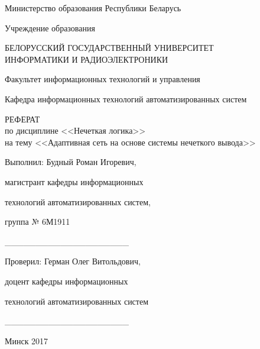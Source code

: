 \begin{titlepage}
\thispagestyle{empty}
\setlength{\parindent}{0cm} %

{\centering{}
  Министерство образования Республики Беларусь

  \smallskip
  Учреждение образования

  БЕЛОРУССКИЙ ГОСУДАРСТВЕННЫЙ УНИВЕРСИТЕТ \\
  ИНФОРМАТИКИ И РАДИОЭЛЕКТРОНИКИ

  \smallskip
  Факультет информационных технологий и управления

  \smallskip
  Кафедра информационных технологий автоматизированных систем\par
}

\vspace{50mm}

{\centering{}
  РЕФЕРАТ \\
  по дисциплине <<Нечеткая логика>> \\
  на тему <<Адаптивная сеть на основе системы нечеткого вывода>>\par
}

\vspace{30mm}

\begin{minipage}{.1\linewidth}
\end{minipage}
\hfill
\begin{minipage}{.7\linewidth}
  Выполнил: Будный Роман Игоревич,

  \hspace{2.4cm} магистрант кафедры информационных

  \hspace{2.4cm} технологий автоматизированных систем,

  \hspace{2.4cm} группа № 6М1911

  \hspace{2.4cm} \_\_\_\_\_\_\_\_\_\_\_\_\_\_\_\_\_\_\_\_

  \bigskip
  Проверил:\; Герман Олег Витольдович,

  \hspace{2.4cm} доцент кафедры информационных

  \hspace{2.4cm} технологий автоматизированных систем

  \hspace{2.4cm} \_\_\_\_\_\_\_\_\_\_\_\_\_\_\_\_\_\_\_\_
\end{minipage}

\vfill
{\centering{}
  Минск 2017\par
}

\setlength{\parindent}{1.25cm} %
\end{titlepage}
